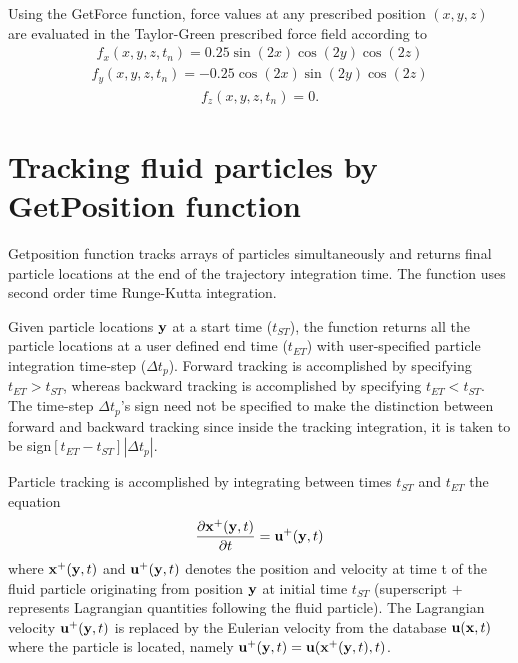 \documentclass[11pt]{article}
\def\bea{\begin{eqnarray}}
\def\eea{\end{eqnarray}}
\begin{document}
Using the GetForce function, force values at any prescribed position $(x,y,z)$ are evaluated in the Taylor-Green prescribed force field according to
\bea
f_x(x,y,z,t_n)= 0.25 \sin(2x)\cos(2y)\cos(2z)
\eea
\bea
f_y(x,y,z,t_n)=  - 0.25 \cos(2x)\sin(2y)\cos(2z)
\eea
\bea
f_z(x,y,z,t_n)= 0.
\eea
 

\section{Tracking fluid particles by GetPosition function}

Getposition function  tracks arrays of particles  simultaneously and returns final particle locations at the end of the trajectory integration time. The function uses second order time Runge-Kutta integration.

Given particle locations ${\bf y}$ at a start time ($t_{ST}$), the function returns all the particle locations at a user defined end time ($t_{ET}$) with user-specified particle integration time-step ($\Delta t_p$). Forward tracking is accomplished by specifying $t_{ET}>t_{ST}$, whereas backward tracking is accomplished by specifying  $t_{ET}<t_{ST}$. The time-step $\Delta t_p$'s sign need not be specified to make the distinction between forward and backward tracking since inside the tracking integration, it is taken to be sign$[t_{ET}-t_{ST}] |\Delta t_p|$. 
   
Particle tracking is accomplished by integrating between times $t_{ST}$ and $t_{ET}$ the equation
\begin{equation}
\frac{\partial {\bf  x}^+({\bf y},t)}{\partial t}={\bf u}^+({\bf y},t)
\label{eq:particlemotionequation}
\end{equation}
where ${\bf x}^+({\bf y},t)$ and ${\bf u}^+({\bf y},t)$ denotes the position and velocity at time t of the fluid particle originating from position ${\bf y}$ at initial time $t_{ST}$ (superscript $+$ represents Lagrangian quantities following the fluid particle).  
The  Lagrangian velocity ${\bf u}^+({\bf y},t)$ is replaced by the Eulerian velocity from the database ${\bf u}({\bf x},t)$ where the particle is located, namely ${\bf u}^+({\bf y},t)={\bf u}({\bf x}^+({\bf y},t),t)$.
\end{document}
